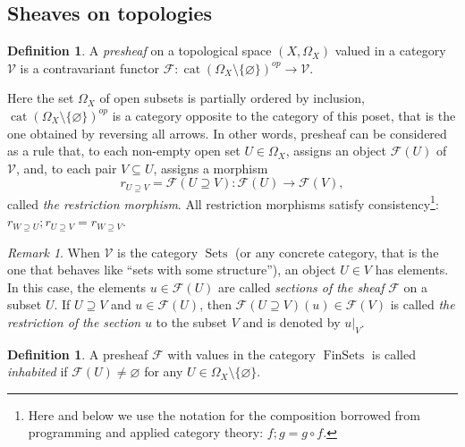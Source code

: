 \documentclass[english,12pt,oneside]{amsproc}
\DeclareMathOperator{\cat}{cat}
\DeclareMathOperator{\FinSets}{FinSets}
\DeclareMathOperator{\Sets}{Sets}
\newcommand{\ca}[1]{\mathcal{#1}}
\newcommand{\Vv}{\mathcal{V}}
\newcounter{stmcounter}[section]
\numberwithin{equation}{section}
\theoremstyle{plain}
\theoremstyle{definition}
\newtheorem{defin}[stmcounter]{Definition}
\theoremstyle{remark}
\newtheorem{rem}[stmcounter]{Remark}
\begin{document}
\subsection{Sheaves on topologies}

\begin{defin}\label{definPresheaf}
A \emph{presheaf} on a topological space $(X,\Omega_X)$ valued in a category $\Vv$ is a contravariant functor $\ca{F}\colon \cat(\Omega_X\setminus\{\varnothing\})^{op}\to \Vv$.
\end{defin}

Here the set $\Omega_X$ of open subsets is partially ordered by inclusion, $\cat(\Omega_X\setminus\{\varnothing\})^{op}$ is a category opposite to the category of this poset, that is the one obtained by reversing all arrows. In other words, presheaf can be considered as a rule that, to each non-empty open set $U\in\Omega_X$, assigns an object $\ca{F}(U)$ of $\Vv$, and, to each pair $V\subseteq U$, assigns a morphism
\[
r_{U\supseteq V}=\ca{F}(U\supseteq V)\colon \ca{F}(U)\to \ca{F}(V),
\]
called \emph{the restriction morphism}. All restriction morphisms satisfy consistency\footnote{Here and below we use the notation for the composition borrowed from programming and applied category theory: $f;g=g\circ f$.}: $r_{W\supseteq U};r_{U\supseteq V}=r_{W\supseteq V}$.

\begin{rem}
When $\Vv$ is the category $\Sets$ (or any concrete category, that is the one that behaves like ``sets with some structure''), an object $U\in V$ has elements.
In this case, the elements $u\in\ca{F}(U)$ are called \emph{sections of the sheaf} $\ca{F}$ on a subset $U$. If $U\supseteq V$ and $u\in\ca{F}(U)$, then $\ca{F}(U\supseteq V)(u)\in \ca{F}(V)$ is called \emph{the restriction of the section} $u$ to the subset $V$ and is denoted by $u|_V$.
\end{rem}

\begin{defin}\label{definInhabited}
A presheaf $\ca{F}$ with values in the category $\FinSets$ is called \emph{inhabited} if $\ca{F}(U)\neq\varnothing$ for any $U\in \Omega_X\setminus\{\varnothing\}$.
\end{defin}
\end{document}
